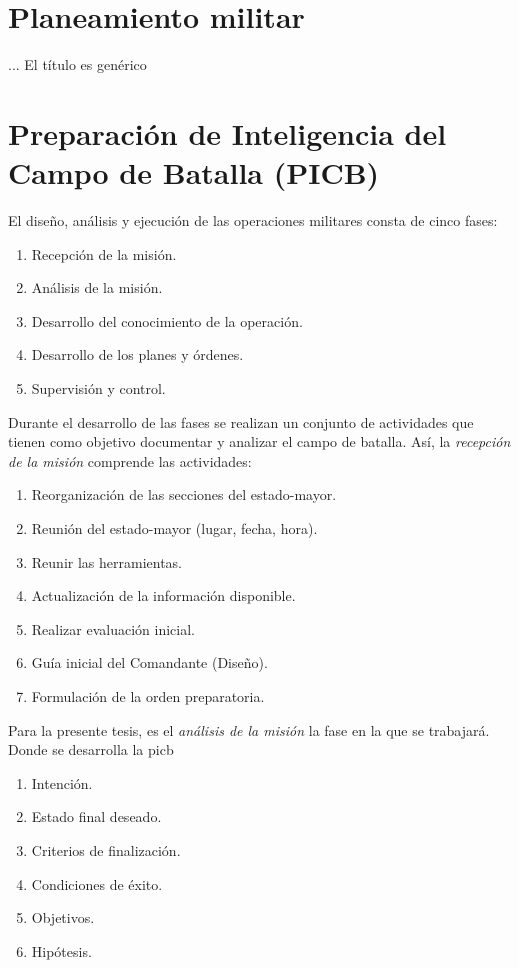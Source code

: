 \section{Planeamiento militar} 
... El título es genérico

\section{Preparación de Inteligencia del Campo de Batalla (PICB)}
El diseño, análisis y ejecución de las operaciones militares consta de cinco fases:
\begin{enumerate}
\item Recepción de la misión.
\item Análisis de la misión.
\item Desarrollo del conocimiento de la operación.
\item Desarrollo de los planes y órdenes.
\item Supervisión y control.
\end{enumerate}

Durante el desarrollo de las fases se realizan un conjunto de actividades que tienen como objetivo documentar y analizar el \gls{campo} de batalla. Así, la \emph{recepción de la misión} comprende las actividades:
\begin{enumerate}
\item Reorganización de las secciones del \gls{estado-mayor}.
\item Reunión del \gls{estado-mayor} (lugar, fecha, hora).
\item Reunir las herramientas.
\item Actualización de la información disponible.
\item Realizar evaluación inicial.
\item Guía inicial del Comandante (Diseño).
\item Formulación de la orden preparatoria.
\end{enumerate}

Para la presente tesis, es el \emph{análisis de la misión} la fase en la que se trabajará. Donde se desarrolla la \gls{picb} 

\begin{enumerate}
\item Intención.
\item Estado final deseado.
\item Criterios de finalización.
\item Condiciones de éxito.
\item Objetivos.
\item Hipótesis.
\end{enumerate}

